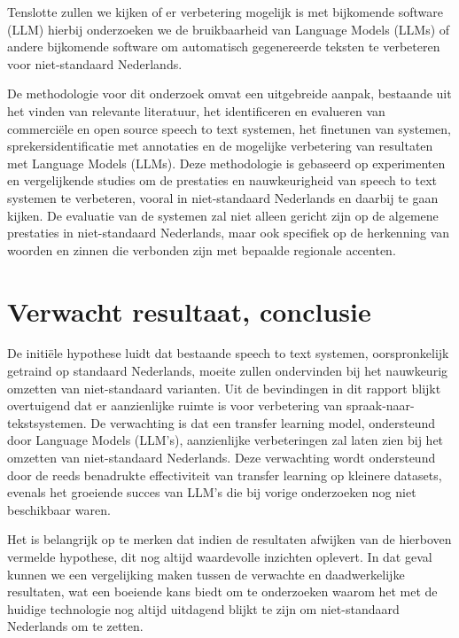 \par Tenslotte zullen we kijken of er verbetering mogelijk is met bijkomende software (LLM) hierbij onderzoeken we de bruikbaarheid van Language Models (LLMs) of andere bijkomende software om automatisch gegenereerde teksten te verbeteren voor niet-standaard Nederlands.


\par De methodologie voor dit onderzoek omvat een uitgebreide aanpak, bestaande uit het vinden van relevante literatuur, het identificeren en evalueren van commerciële en open source speech to text systemen, het finetunen van systemen, sprekersidentificatie met annotaties en de mogelijke verbetering van resultaten met Language Models (LLMs). Deze methodologie is gebaseerd op experimenten en vergelijkende studies om de prestaties en nauwkeurigheid van speech to text systemen te verbeteren, vooral in niet-standaard Nederlands en daarbij te gaan kijken. De evaluatie van de systemen zal niet alleen gericht zijn op de algemene prestaties in niet-standaard Nederlands, maar ook specifiek op de herkenning van woorden en zinnen die verbonden zijn met bepaalde regionale accenten.

\section{Verwacht resultaat, conclusie}%
\label{sec:verwachte_resultaten}

De initiële hypothese luidt dat bestaande speech to text systemen, oorspronkelijk getraind op standaard Nederlands, moeite zullen ondervinden bij het nauwkeurig omzetten van niet-standaard varianten.
Uit de bevindingen in dit rapport blijkt overtuigend dat er aanzienlijke ruimte is voor verbetering van spraak-naar-tekstsystemen. De verwachting is dat een transfer learning model, ondersteund door Language Models (LLM's), aanzienlijke verbeteringen zal laten zien bij het omzetten van niet-standaard Nederlands. Deze verwachting wordt ondersteund door de reeds benadrukte effectiviteit van transfer learning op kleinere datasets, evenals het groeiende succes van LLM's die bij vorige onderzoeken nog niet beschikbaar waren.

Het is belangrijk op te merken dat indien de resultaten afwijken van de hierboven vermelde hypothese, dit nog altijd waardevolle inzichten oplevert. In dat geval kunnen we een vergelijking maken tussen de verwachte en daadwerkelijke resultaten, wat een boeiende kans biedt om te onderzoeken waarom het met de huidige technologie nog altijd uitdagend blijkt te zijn om niet-standaard Nederlands om te zetten.

